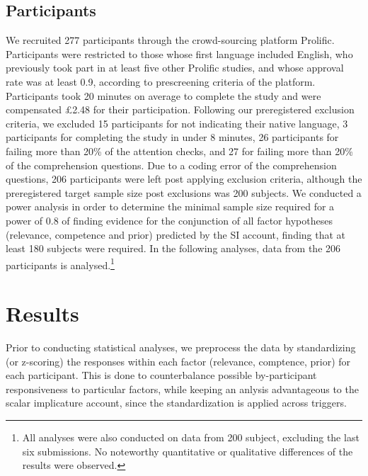 \documentclass{sp}
\begin{document}
\subsection{Participants}
We recruited 277 participants through the crowd-sourcing platform Prolific. Participants were restricted to those whose first language included English, who previously took part in at least five other Prolific studies, and whose approval rate was at least 0.9, according to prescreening criteria of the platform. Participants took 20 minutes on average to complete the study and were compensated \pounds2.48 for their participation. Following our preregistered exclusion criteria, we excluded 15 participants for not indicating their native language, 3 participants for completing the study in under 8 minutes, 26 participants for failing more than 20\% of the attention checks, and 27 for failing more than 20\% of the comprehension questions. Due to a coding error of the comprehension questions, 206 participants were left post applying exclusion criteria, although the preregistered target sample size post exclusions was 200 subjects. We conducted a power analysis in order to determine the minimal sample size required for a power of 0.8 of finding evidence for the conjunction of all factor hypotheses (relevance, competence and prior) predicted by the SI account, finding that at least 180 subjects were required. 
In the following analyses, data from the 206 participants is analysed.\footnote{All analyses were also conducted on data from 200 subject, excluding the last six submissions. No noteworthy quantitative or qualitative differences of the results were observed.}

\section{Results}
Prior to conducting statistical analyses, we preprocess the data by standardizing (or z-scoring) the responses within each factor (relevance, comptence, prior) for each participant. This is done to counterbalance possible by-participant responsiveness to particular factors, while keeping an anlysis advantageous to the scalar implicature account, since the standardization is applied across triggers. 
\end{document}

